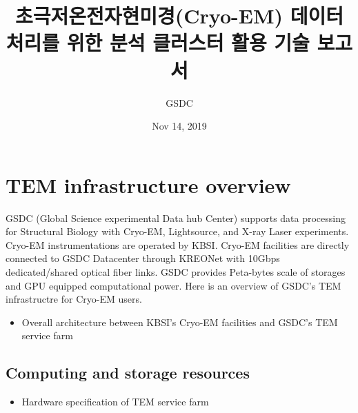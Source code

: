 \documentclass[letterpaper,10pt,english]{sphinxmanual}
\title{초극저온전자현미경(Cryo-EM) 데이터 처리를 위한 분석 클러스터 활용 기술 보고서}
\date{Nov 14, 2019}
\author{GSDC}
\begin{document}
\pagestyle{empty}
\sphinxmaketitle
\pagestyle{plain}
\sphinxtableofcontents
\pagestyle{normal}
\label{\detokenize{index::doc}}



\chapter{TEM infrastructure overview}
\label{\detokenize{infra:tem-infrastructure-overview}}\label{\detokenize{infra::doc}}
GSDC (Global Science experimental Data hub Center) supports data processing for Structural Biology with Cryo-EM, Lightsource, and X-ray Laser experiments.
Cryo-EM instrumentations are operated by KBSI. Cryo-EM facilities are directly connected to GSDC Datacenter through KREONet with 10Gbps dedicated/shared optical fiber links. GSDC provides Peta-bytes scale of storages and GPU equipped computational power. Here is an overview of GSDC’s TEM infrastructre for Cryo-EM users.
\begin{itemize}
\item {} 
Overall architecture between KBSI’s Cryo-EM facilities and GSDC’s TEM service farm

\end{itemize}



\section{Computing and storage resources}
\label{\detokenize{infra:computing-and-storage-resources}}\begin{itemize}
\item {} 
Hardware specification of TEM service farm

\end{itemize}
\end{document}
